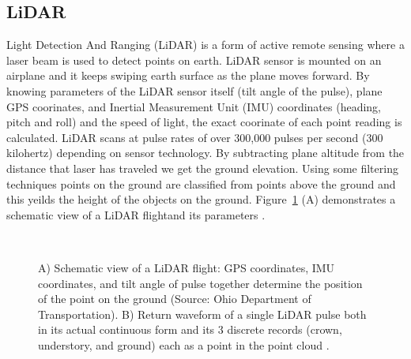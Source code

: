 \subsection{LiDAR}

Light Detection And Ranging (LiDAR) is a form of active remote sensing where a laser beam is used to detect points on earth. LiDAR sensor is mounted on an airplane and it keeps swiping earth surface as the plane moves forward. By knowing parameters of the LiDAR sensor itself (tilt angle of the pulse), plane GPS coorinates, and Inertial Measurement Unit (IMU) coordinates (heading, pitch and roll) and the speed of light, the exact coorinate of each point reading is calculated. LiDAR scans at pulse rates of over 300,000 pulses per second (300 kilohertz) depending on sensor technology. By subtracting plane altitude from the distance that laser has traveled we get the ground elevation.  Using some filtering techniques points on the ground are classified from points above the ground and this yeilds the height of the objects on the ground. Figure~\ref{fig:lidar} (A) demonstrates a schematic view of a LiDAR flightand its parameters \citep{schmid2008lidar}.


\begin{figure}[b!]
  \begin{center}
    \centering
    \mbox{
       \quad
       \quad
     }
    
    \caption[Schematic view of a LiDAR flight]{A) Schematic view of a LiDAR flight: GPS coordinates, IMU coordinates, and tilt angle of pulse together determine the position of the point on the ground (Source: Ohio Department of Transportation). B) Return waveform of a single LiDAR pulse both in its actual continuous form and its 3 discrete records (crown, understory, and ground) each as a point in the point cloud \citep{fernandez2014now}.}
    \label{fig:lidar}
  \end{center}
\end{figure}


